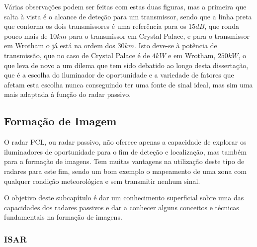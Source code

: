 Várias observações podem ser feitas com estas duas figuras, mas a primeira que salta à vista é o alcance de deteção para um transmissor, sendo que a linha preta que contorna os dois transmissores é uma referência para os $15dB$, que ronda pouco mais de $10km$ para o transmissor em Crystal Palace, e para o transmissor em Wrotham o já está na ordem dos $30km$. Isto deve-se à potência de transmissão, que no caso de Crystal Palace é de $4kW$ e em Wrotham, $250kW$, o que leva de novo a um dilema que tem sido debatido ao longo desta dissertação, que é a escolha do iluminador de oportunidade e a variedade de fatores que afetam esta escolha nunca conseguindo ter uma fonte de sinal ideal, mas sim uma mais adaptada à função do radar passivo.


\subsection{Formação de Imagem}
O radar \gls{PCL}, ou radar passivo, não oferece apenas a capacidade de explorar os iluminadores de oportunidade para o fim de deteção e localização, mas também para a formação de imagens. Tem muitas vantagens na utilização deste tipo de radares para este fim, sendo um bom exemplo o mapeamento de uma zona com qualquer condição meteorológica e sem transmitir nenhum sinal.\par 
O objetivo deste subcapítulo é dar um conhecimento superficial sobre uma das capacidades dos radares passivos e dar a conhecer alguns conceitos e técnicas fundamentais na formação de imagens.\par 

\subsubsection*{\gls{ISAR}}